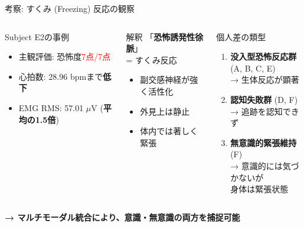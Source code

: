 \documentclass[aspectratio=169,10pt]{beamer}
\begin{document}
\begin{frame}{考察: すくみ (Freezing) 反応の観察}
\begin{columns}[T]
\begin{block}{Subject E2の事例}
\begin{itemize}
\item 主観評価: 恐怖度\textcolor{red}{7点/7点}
\item 心拍数: 28.96 bpmまで\textbf{低下}
\item EMG RMS: 57.01 $\mu$V (\textbf{平均の1.5倍})
\end{itemize}
\end{block}

\begin{alertblock}{解釈}
「\textbf{恐怖誘発性徐脈}」\\
= すくみ反応
\begin{itemize}
\item 副交感神経が強く活性化
\item 外見上は静止
\item 体内では著しく緊張
\end{itemize}
\end{alertblock}

\begin{block}{個人差の類型}
\begin{enumerate}
\item \textbf{没入型恐怖反応群}\\
(A, B, C, E)\\
→ 生体反応が顕著

\item \textbf{認知失敗群} (D, F)\\
→ 追跡を認知できず

\item \textbf{無意識的緊張維持} (F)\\
→ 意識的には気づかないが\\
\quad 身体は緊張状態
\end{enumerate}
\end{block}
\end{columns}

\vspace{0.3cm}
\begin{center}
\textbf{→ マルチモーダル統合により、意識・無意識の両方を捕捉可能}
\end{center}
\end{frame}
\end{document}
